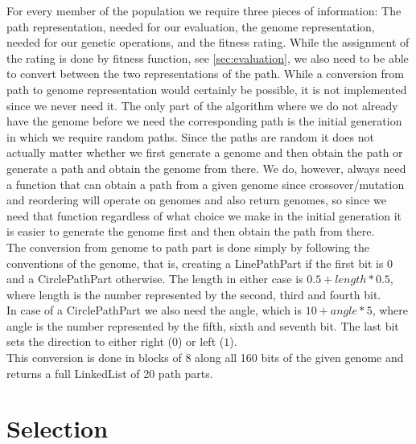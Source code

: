 For every member of the population we require three pieces of information: The path representation, needed for our evaluation, the genome representation, needed for our genetic operations, and the fitness rating. While the assignment of the rating is done by fitness function, see \ref{sec:evaluation}, we also need to be able to convert between the two representations of the path. While a conversion from path to genome representation would certainly be possible, it is not implemented since we never need it. The only part of the algorithm where we do not already have the genome before we need the corresponding path is the initial generation in which we require random paths. Since the paths are random it does not actually matter whether we first generate a genome and then obtain the path or generate a path and obtain the genome from there. We do, however, always need a function that can obtain a path from a given genome since crossover/mutation and reordering will operate on genomes and also return genomes, so since we need that function regardless of what choice we make in the initial generation it is easier to generate the genome first and then obtain the path from there.\\
The conversion from genome to path part is done simply by following the conventions of the genome, that is, creating a LinePathPart if the first bit is 0 and a CirclePathPart otherwise. The length in either case is $0.5 + length * 0.5$, where length is the number represented by the second, third and fourth bit.\\
In case of a CirclePathPart we also need the angle, which is $10 + angle * 5$, where angle is the number represented by the fifth, sixth and seventh bit. The last bit sets the direction to either right ($0$) or left ($1$).\\
This conversion is done in blocks of 8 along all 160 bits of the given genome and returns a full LinkedList of 20 path parts.

\section{Selection} %
\label{sec:imp_selection}

